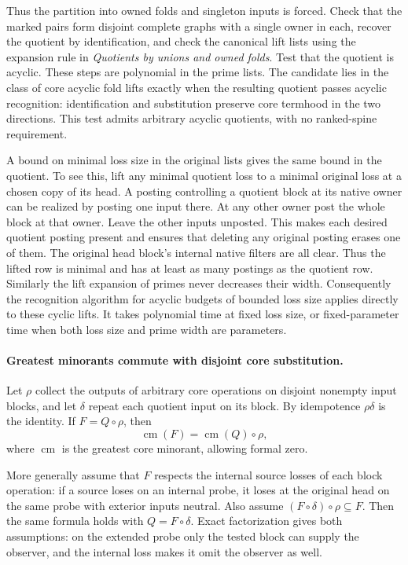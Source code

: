 Thus the partition into owned folds and singleton
inputs is forced. Check that the marked pairs form
disjoint complete graphs with a single owner in
each, recover the quotient by identification,
and check the canonical lift lists using the
expansion rule in \emph{Quotients by unions and
owned folds}. Test that the quotient is acyclic.
These steps are polynomial in the prime lists.
The candidate lies in the class of core acyclic
fold lifts exactly when the resulting quotient
passes acyclic recognition: identification and
substitution preserve core termhood in the two
directions. This test admits arbitrary acyclic
quotients, with no ranked-spine requirement.

A bound on minimal loss size in the original
lists gives the same bound in the quotient.
To see this, lift any minimal quotient loss
to a minimal original loss at a chosen copy of
its head. A posting controlling a quotient
block at its native owner can be realized by
posting one input there. At any other owner
post the whole block at that owner. Leave the
other inputs unposted. This makes each desired
quotient posting present and ensures that
deleting any original posting erases one of
them. The original head block's internal
native filters are all clear. Thus the lifted
row is minimal and has at least as many
postings as the quotient row. Similarly the
lift expansion of primes never decreases their
width. Consequently the recognition algorithm
for acyclic budgets of bounded loss size
applies directly to these cyclic lifts. It
takes polynomial time at fixed loss size,
or fixed-parameter time when both loss size
and prime width are parameters.

\paragraph{Greatest minorants commute with disjoint core substitution.}
Let $\rho$ collect the outputs of arbitrary core
operations on disjoint nonempty input blocks, and
let $\delta$ repeat each quotient input on its block.
By idempotence $\rho\delta$ is the identity. If
$F=Q\circ\rho$, then
\[
           \operatorname{cm}(F)
             =\operatorname{cm}(Q)\circ\rho,
\]
where $\operatorname{cm}$ is the greatest core
minorant, allowing formal zero.

More generally assume that $F$ respects the internal
source losses of each block operation: if a source
loses on an internal probe, it loses at the original
head on the same probe with exterior inputs neutral.
Also assume $(F\circ\delta)\circ\rho\subseteq F$.
Then the same formula holds with $Q=F\circ\delta$.
Exact factorization gives both assumptions: on the
extended probe only the tested block can supply the
observer, and the internal loss makes it omit the
observer as well.

